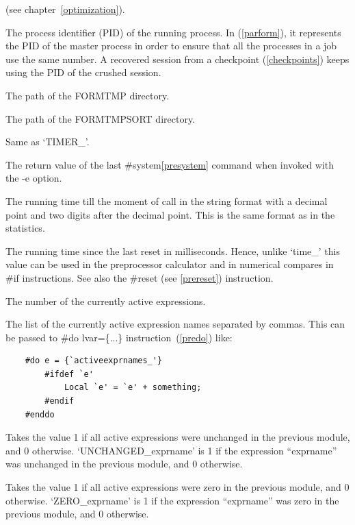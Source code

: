 \begin{description}
               (see chapter~\ref{optimization}).
\item[PID\_]         The process identifier (PID)   of
               the running process. In \ParFORM{} (\ref{parform}), it represents
               the PID of the master process in order to ensure that all the
               processes in a job use the same number. A recovered session from
               a checkpoint (\ref{checkpoints}) keeps using the PID of the
               crushed session.
\item[FORMTMP\_] The path of the FORMTMP directory.
\item[FORMTMPSORT\_] The path of the FORMTMPSORT directory.
\item[STOPWATCH\_] Same as `TIMER\_'.
\item[SYSTEMERROR\_] The return value of the last \#system\ref{presystem}
               command when invoked with the -e option.
\item[TIME\_]  The running time till the moment of call in the string format
               with a decimal point and two digits after the decimal point. 
               This is the same format as in the statistics.
\item[TIMER\_] The running time since the last reset in milliseconds. Hence, 
               unlike `time\_' this value can be used in the preprocessor 
               calculator and in numerical compares in \#if instructions.
               See also the \#reset (see \ref{prereset}) instruction.
\item[NUMACTIVEEXPRS\_]  The number of the currently active expressions.
\item[ACTIVEEXPRNAMES\_]  The list of the currently active expression names 
               separated by commas. This can be passed to \#do lvar=\{...\} 
               instruction~(\ref{predo}) like: 
\begin{verbatim}
    #do e = {`activeexprnames_'}
        #ifdef `e'
            Local `e' = `e' + something;
        #endif
    #enddo
\end{verbatim}
\item[UNCHANGED\_] Takes the value 1 if all active expressions were unchanged in the
                   previous module, and 0 otherwise. `UNCHANGED\_exprname' is 1 if the
                   expression ``exprname'' was unchanged in the previous module, and
                   0 otherwise.
\item[ZERO\_] Takes the value 1 if all active expressions were zero in the
                   previous module, and 0 otherwise. `ZERO\_exprname' is 1 if the
                   expression ``exprname'' was zero in the previous module, and
                   0 otherwise.
\end{description}

